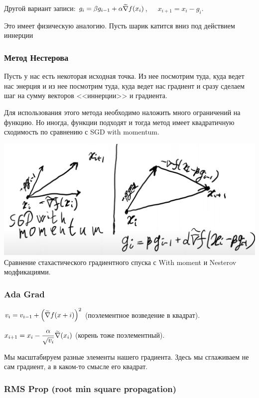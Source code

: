 Другой вариант записи: $g_i = \beta g_{i - 1} + \alpha \widetilde{\nabla} f (x_i)$,~~~$x_{i+1} = x_i - g_i$.

Это имеет физическую аналогию. Пусть шарик катится вниз под действием иннерции

\subsubsection{Метод Нестерова}
Пусть у нас есть некоторая исходная точка. Из нее посмотрим туда, куда ведет нас энерция и из нее посмотрим туда, куда ведет нас градиент и сразу сделаем шаг на сумму векторов <<иннерции>> и градиента.

Для использования этого метода необходимо наложить много ограничений на функцию. Но иногда, функции подходят и тогда метод имеет квадратичную сходимость по сравнению с SGD with momentum.

\begin{center}
    \includegraphics[scale=0.4]{img/sgd-with-moment-vs-nesterov.png}\\
    {Сравнение стахастического градиентного спуска с With moment и Nesterov модфикациями.}
\end{center}

\subsubsection{Ada Grad}
$v_i = v_{i - 1} + \left( \widetilde{\nabla} f (x+i) \right)^2$ (поэлементное возведение в квадрат).

$x_{i + 1} = x_i - \dfrac{\alpha}{\sqrt{v_i}}\widetilde{\nabla} (x_i)$ (корень тоже поэлементный).

Мы масштабируем разные элементы нашего градиента. Здесь мы сглаживаем не сам градиент, а в каком-то смысле его квадрат.

\subsubsection{RMS Prop (root min square propagation)}

